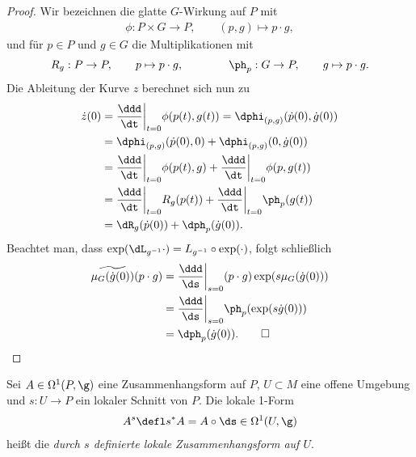 \documentclass[%
	paper=a5,%
	fleqn,%
	DIV=18,%
	BCOR=0mm,
	fontsize=11pt,
	titlepage=false,%
	bibliography=totoc,
	DIV=18,%
	twoside=true,
	pdftitle=Riemannsche Geometrie,
	pdfauthor=Uwe Semmelmann,
	numbers=noendperiod]%
	{scrbook}
\begin{document}
\begin{proof}
Wir bezeichnen die glatte $G$-Wirkung auf $P$ mit
\begin{align*}
\phi\colon P\times G\to P,\qquad (p,g)\mapsto p\cdot g,
\end{align*}
und für $p\in P$ und $g\in G$ die Multiplikationen mit
\begin{align*}
R_g : P\to P,\qquad p\mapsto  p\cdot g,\qquad\qquad \ph_p : G\to P,\qquad
g\mapsto p\cdot g.
\end{align*}
Die Ableitung der Kurve $z$ berechnet sich nun zu
\begin{align*}
\dot{z}(0) &= \frac{\ddd}{\dt}\bigg|_{t=0} \phi(p(t),g(t))
= \dphi_{(p,g)}(\dot{p}(0),\dot{g}(0))\\
&= \dphi_{(p,g)}(\dot{p}(0),0) + \dphi_{(p,g)}(0,\dot{g}(0))\\
&= \frac{\ddd}{\dt}\bigg|_{t=0} \phi(p(t),g)
+ \frac{\ddd}{\dt}\bigg|_{t=0} \phi(p,g(t))\\
&= \frac{\ddd}{\dt}\bigg|_{t=0} R_g(p(t))
+ \frac{\ddd}{\dt}\bigg|_{t=0} \ph_p(g(t))\\
&= \dR_g(\dot{p}(0)) + \dph_p(\dot{g}(0)). 
\end{align*}
Beachtet man, dass $\exp(\dL_{g^{-1}} \cdot ) = L_{g^{-1}}\circ \exp(\cdot)$,
folgt schließlich
\begin{align*}
\widetilde{\mu_G(\dot g(0))}(p\cdot g) &= 
\frac{\ddd}{\ds}\bigg|_{s=0} (p\cdot g) \exp(s \mu_G(\dot{g}(0)))\\
&=\frac{\ddd}{\ds}\bigg|_{s=0} \ph_p(\exp(s \dot{g}(0)))\\
&= \dph_p(\dot{g}(0)).\qed
\end{align*}
\end{proof}

\begin{defn}
Sei $A\in\Omega^1(P,\g)$ eine Zusammenhangsform auf $P$, $U\subset M$ eine
offene Umgebung und $s\colon U\to P$ ein lokaler Schnitt von $P$. Die lokale 1-Form
\begin{align*}
A^s \defl s^* A =  A\circ \ds \in \Omega^1(U,\g)
\end{align*}
heißt die \emph{durch $s$ definierte lokale Zusammenhangsform auf $U$}.\fish
\end{defn}
\end{document}
